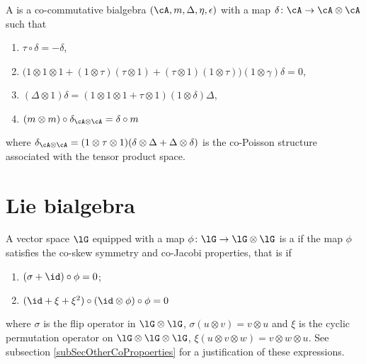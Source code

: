 \begin{definition}
A  is a co-commutative bialgebra $(\cA,m,\Delta,\eta,\epsilon)$ with a map $\delta\colon \cA\to \cA\otimes\cA$ such that
\begin{enumerate}
\item $\tau\circ\delta=-\delta$,
\item $\big( 1\otimes 1\otimes 1+(1\otimes\tau)(\tau\otimes 1)+(\tau\otimes 1)(1\otimes\tau) \big)(1\otimes\gamma)\delta=0$,
\item $(\Delta\otimes 1)\delta=(1\otimes 1\otimes 1+\tau\otimes 1)(1\otimes\delta)\Delta$,
\item $(m\otimes m)\circ\delta_{\cA\otimes\cA}=\delta\circ m$
\end{enumerate}
where $\delta_{\cA\otimes\cA}=(1\otimes\tau\otimes 1)(\delta\otimes\Delta+\Delta\otimes \delta)$ is the co-Poisson structure associated with the tensor product space.
\end{definition}

\section{Lie bialgebra}

\begin{definition}
    A vector space \( \lG\) equipped with a map \( \phi\colon \lG\to \lG\otimes\lG\) is a \cite{Farnsteiner} if the map \( \phi\) satisfies the co-skew symmetry and co-Jacobi properties, that is if 
    \begin{enumerate}
        \item
            $(\sigma+\id)\circ\phi=0$;
        \item
            $(\id+\xi+\xi^2)\circ(\id\otimes\phi)\circ\phi=0$
    \end{enumerate}
    where \( \sigma\) is the flip operator in \( \lG\otimes\lG\), \( \sigma(u\otimes v)=v\otimes u\) and \( \xi\) is the cyclic permutation operator on \( \lG\otimes\lG\otimes\lG\), \( \xi(u\otimes v\otimes w)=v\otimes w\otimes u\). See subsection \ref{subSecOtherCoPropoerties} for a justification of these expressions.
\end{definition}

